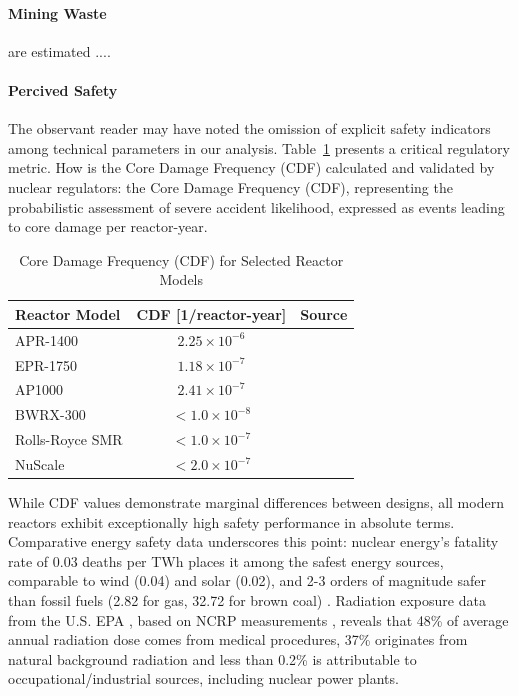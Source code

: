 \paragraph{Mining Waste} are estimated ....

\paragraph{Percived Safety}
The observant reader may have noted the omission of explicit safety indicators among technical parameters in our analysis. Table~\ref{tab:safety-performance} presents a critical regulatory metric. How is the Core Damage Frequency (CDF) calculated and validated by nuclear regulators: the Core Damage Frequency (CDF), representing the probabilistic assessment of severe accident likelihood, expressed as events leading to core damage per reactor-year.

\begin{table}[!ht]
    \centering
    \begin{tabularx}{\textwidth}{X c c}
        \toprule
        \textbf{Reactor Model} & \textbf{CDF [1/reactor-year]} & Source\\
        \midrule
        APR-1400         & $2.25 \times 10^{-6}$ & \cite{KHNP_EU_APR_Characteristics} \\
        EPR-1750         & $1.18 \times 10^{-7}$ & \cite{EDFEnergy_PSA_2012} \\
        AP1000           & $2.41 \times 10^{-7}$ & \cite{NRC_ML23161A411} \\
        BWRX-300         & $<1.0 \times 10^{-8}$ & \cite{ENCO_SMR_Analysis_2022} \\
        Rolls-Royce SMR  & $<1.0 \times 10^{-7}$ & \cite{ENCO_SMR_Analysis_2022} \\
        NuScale          & $<2.0 \times 10^{-7}$ & \cite{ENCO_SMR_Analysis_2022} \\
        \bottomrule
    \end{tabularx}
    \caption{Core Damage Frequency (CDF) for Selected Reactor Models}
    \label{tab:safety-performance}
\end{table}

While CDF values demonstrate marginal differences between designs, all modern reactors exhibit exceptionally high safety performance in absolute terms. Comparative energy safety data underscores this point: nuclear energy's fatality rate of 0.03 deaths per TWh places it among the safest energy sources, comparable to wind (0.04) and solar (0.02), and 2-3 orders of magnitude safer than fossil fuels (2.82 for gas, 32.72 for brown coal) \cite{Markandya_Wilkinson_2007, SOVACOOL20163952, OurWorldInData_EnergyDeathRates_2025}. Radiation exposure data from the U.S. EPA \cite{EPA_Radiation_Sources_2025}, based on NCRP measurements \cite{NCRP_Report_160_2009}, reveals that 48\% of average annual radiation dose comes from medical procedures, 37\% originates from natural background radiation and less than 0.2\% is attributable to occupational/industrial sources, including nuclear power plants.

